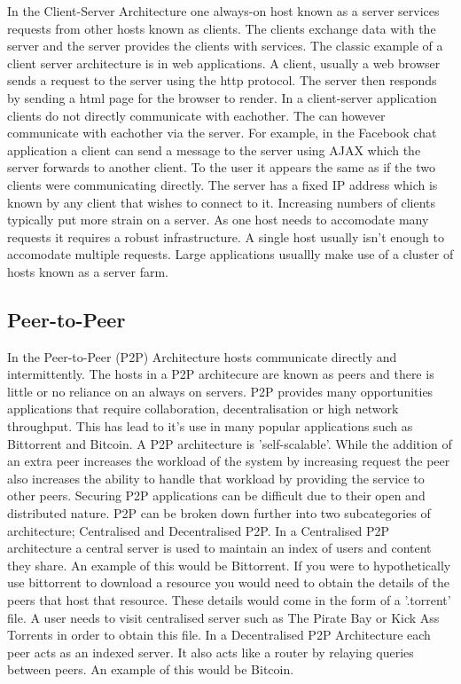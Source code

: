 \documentclass[12pt]{amsart}
\begin{document}
In the Client-Server Architecture one always-on host known as a server services requests from other hosts known as clients. The clients exchange data with the server and the server provides the clients with services. The classic example of a client server architecture is in web applications. A client, usually a web browser sends a request to the server using the http protocol. The server then responds by sending a html page for the browser to render. In a client-server application clients do not directly communicate with eachother. The can however communicate with eachother via the server. For example, in the Facebook chat application a client can send a message to the server using AJAX which the server forwards to another client. To the user it appears the same as if the two clients were communicating directly. The server has a fixed IP address which is known by any client that wishes to connect to it.
Increasing numbers of clients typically put more strain on a server. As one host needs to accomodate many requests it requires a robust infrastructure. A single host usually isn't enough to accomodate multiple requests. Large applications usuallly make use of a cluster of hosts known as a server farm.


\subsection{Peer-to-Peer}

In the Peer-to-Peer (P2P) Architecture hosts communicate directly and intermittently. The hosts in a P2P architecure are known as peers and there is little or no reliance on an always on servers. P2P provides many opportunities applications that require collaboration, decentralisation or high network throughput. This has lead to it's use in many popular applications such as Bittorrent and Bitcoin. A P2P architecture is 'self-scalable'. While the addition of an extra peer increases the workload of the system by increasing request the peer also increases the ability to handle that workload by providing the service to other peers. Securing P2P applications can be difficult due to their open and distributed nature.
P2P can be broken down further into two subcategories of architecture; Centralised and Decentralised P2P. In a Centralised P2P architecture a central server is used to maintain an index of users and content they share. 
An example of this would be Bittorrent. If you were to hypothetically use bittorrent to download a resource you would need to obtain the details of the peers that host that resource. These details would come in the form of a '.torrent' file. A user needs to visit centralised server such as The Pirate Bay or Kick Ass Torrents in order to obtain this file.
In a Decentralised P2P Architecture each peer acts as an indexed server. It also acts like a router by relaying queries between peers. An example of this would be Bitcoin. 
\end{document}
